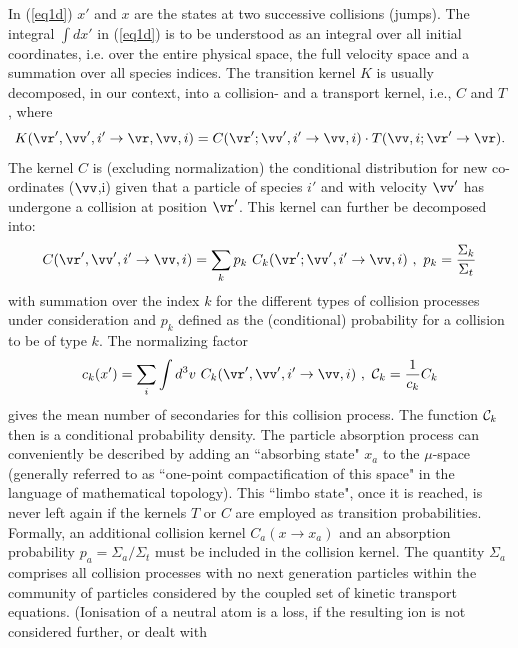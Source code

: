 In (\ref{eq1d}) $x'$ and $x$ are the states at two successive
collisions (jumps). The integral $\int dx'$ in (\ref{eq1d}) is to be understood as
an integral over all initial coordinates, i.e. over the entire physical space, the full velocity space and a
summation over all species indices. The transition kernel $K$ is
usually decomposed, in our context, into a collision- and a
transport kernel, i.e., $C$ and $T$ , where
\begin{equation} \label{eq1.2}
K(\vr  ' , \vv  ' , i ' \rightarrow
\vr  , \vv , i)   =   C( \vr ' ;
\vv ' , i '   \rightarrow   \vv , i)  \cdot T(
\vv , i; \vr ' \rightarrow \vr )   .
\end{equation}
The kernel $C$ is (excluding normalization) the conditional
distribution for new co-ordinates ($\vv $,i) given that
a particle of species $i'$ and with velocity $\vv'$ has
undergone a collision at position $\vr ' $. This kernel
can further be decomposed into:
\begin{equation} \label{eq1.3}
C( \vr ' , \vv ' , i '   \rightarrow
\vv , i) =   \sum_{k} {p_k  \ C_k ( \vr ' ;
              \vv ' , i '   \rightarrow \vv, i)} \
, \ p_k   =    \frac{\Sigma_k}{\Sigma_t}
\end{equation}
with summation over the index $k$ for the different types of
collision processes under consideration and $p_k$ defined as the
(conditional) probability for a collision to be of type $k$. The
normalizing factor
\begin{equation} \label{eq1.4}
c_k (x ')   =
  \sum_{i}   \int d^3v \  C_k (
\vr ' , \vv ' , i ' \rightarrow
\vv , i ) \   , \  {\cal{C}}_k   =    \frac{1}{c_k}
C_k
\end{equation}
gives the mean number of secondaries for this collision process.
The function $ {\cal{C}}_k$ then is a conditional probability
density. The particle absorption process can conveniently be
described by adding an ``absorbing state" $x_a$ to the $\mu$-space
(generally referred to as ``one-point compactification of this
space" in the language of mathematical topology). This ``limbo
state", once it is reached, is never left again if the kernels $T$
or $C$ are employed as transition probabilities. Formally, an
additional collision kernel $C_a (x \rightarrow x_a )$ and an
absorption probability $ p_a   =   \Sigma_a / \Sigma_t$ must be
included in the collision kernel. The quantity $ \Sigma_a$
comprises all collision processes with no next generation
particles within the community of particles considered by the coupled set of kinetic transport equations.
(Ionisation of a neutral atom is a loss, if the resulting ion is not considered further, or dealt with
